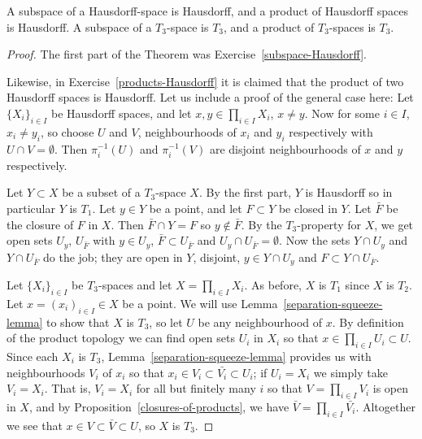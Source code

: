 \begin{thm}
  A subspace of a Hausdorff-space is Hausdorff, and a product of Hausdorff spaces is Hausdorff. A subspace of a $T_3$-space is $T_3$, and a product of $T_3$-spaces is $T_3$.
\end{thm}
\begin{proof}
  The first part of the Theorem was Exercise~\ref{subspace-Hausdorff}.
  
  Likewise, in Exercise~\ref{products-Hausdorff} it is claimed that the product of two Hausdorff spaces is Hausdorff. Let us include a proof of the general case here: Let $\{X_i\}_{i \in I}$ be Hausdorff spaces, and let $x, y \in \prod_{i \in I} X_i$, $x \not= y$. Now for some $i \in I$, $x_i \not= y_i$, so choose $U$ and $V$, neighbourhoods of $x_i$ and $y_i$ respectively with $U \cap V = \emptyset$. Then $\pi_i^{-1}(U)$ and $\pi_i^{-1}(V)$ are disjoint neighbourhoods of $x$ and $y$ respectively.

  Let $Y \subset X$ be a subset of a $T_3$-space $X$. By the first part, $Y$ is Hausdorff so in particular $Y$ is $T_1$. Let $y \in Y$ be a point, and let $F \subset Y$ be closed in $Y$. Let $\bar{F}$ be the closure of $F$ in $X$. Then $\bar{F} \cap Y = F$ so $y \notin \bar{F}$. By the $T_3$-property for $X$, we get open sets $U_y$, $U_{\bar F}$ with $y \in U_y$, $\bar F \subset U_{\bar F}$ and $U_y \cap U_{\bar F} = \emptyset$. Now the sets $Y \cap U_y$ and $Y \cap U_{\bar F}$ do the job; they are open in $Y$, disjoint, $y \in Y \cap U_y$ and $F \subset Y \cap U_{\bar F}$.
  
  Let $\{X_i\}_{i \in I}$ be $T_3$-spaces and let $X = \prod_{i \in I} X_i$. As before, $X$ is $T_1$ since $X$ is $T_2$. Let $x = (x_i)_{i \in I} \in X$ be a point. We will use Lemma~\ref{separation-squeeze-lemma} to show that $X$ is $T_3$, so let $U$ be any neighbourhood of $x$. By definition of the product topology we can find open sets $U_i$ in $X_i$ so that $x \in \prod_{i \in I} U_i \subset U$. Since each $X_i$ is $T_3$, Lemma~\ref{separation-squeeze-lemma} provides us with neighbourhoods $V_i$ of $x_i$ so that $x_i \in V_i \subset \bar{V_i} \subset U_i$; if $U_i = X_i$ we simply take $V_i = X_i$. That is, $V_i = X_i$ for all but finitely many $i$ so that $V = \prod_{i \in I} V_i$ is open in $X$, and by Proposition~\ref{closures-of-products}, we have $\bar V = \prod_{i \in I} \bar{V_i}$. Altogether we see that $x \in V \subset \bar V \subset U$, so $X$ is $T_3$.
\end{proof}


